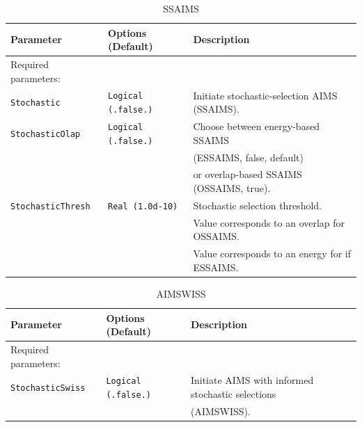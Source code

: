 \documentclass[11pt]{article}
\begin{document}
\clearpage
\newpage
\begin{table}[h]
\caption{SSAIMS}
\begin{tabular}{ l l l }
\hline\hline
Parameter & Options (Default)& Description \\
\hline
Required parameters:\\
{\tt Stochastic}          & {\tt Logical (.false.) }                & {\small Initiate stochastic-selection AIMS (SSAIMS).}\\
{\tt StochasticOlap}          & {\tt Logical (.false.) }                & {\small Choose between energy-based SSAIMS}\\&& 
{\small (ESSAIMS, false, default)}\\&& 
{\small or overlap-based SSAIMS (OSSAIMS, true).}\\
{\tt StochasticThresh}          & {\tt Real (1.0d-10) }                & {\small Stochastic selection threshold.} \\&&
{\small Value corresponds to an overlap for OSSAIMS.} \\&&
{\small Value corresponds to an energy for if ESSAIMS.} \\
\hline\hline
\end{tabular}
\end{table}

\begin{table}[h]
\caption{AIMSWISS}
\begin{tabular}{ l l l }
\hline\hline
Parameter & Options (Default)& Description \\
\hline
Required parameters:\\
{\tt StochasticSwiss}          & {\tt Logical (.false.) }                & {\small Initiate AIMS with informed stochastic selections} \\&&  
{\small(AIMSWISS).}\\
\hline\hline
\end{tabular}
\end{table}

\end{document}
